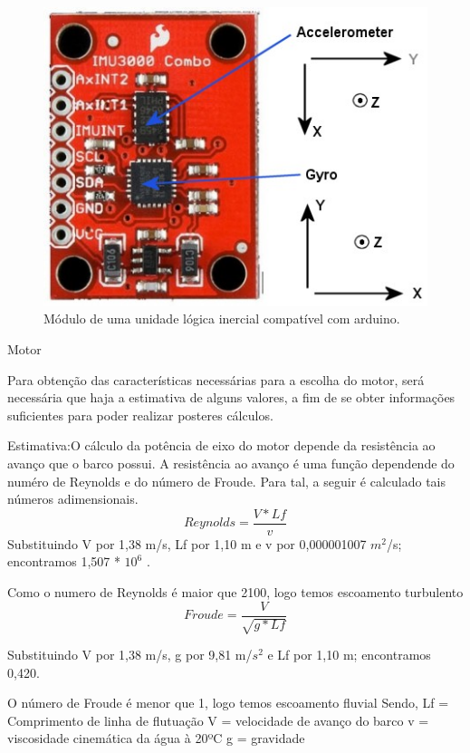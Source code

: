  \begin{figure} [!htp]
	\centering
	\includegraphics[scale=0.6]{figuras/IMU}
	\caption{Módulo de uma unidade lógica inercial compatível com arduino.}
	\label{IMU}
\end{figure}

Motor 


Para obtenção das características necessárias para a escolha do motor, será necessária que haja a estimativa de alguns valores, a fim de se obter informações suficientes para poder realizar posteres cálculos.



Estimativa:O cálculo da potência de eixo do motor depende da resistência ao avanço que o barco possui. A resistência ao avanço é uma função dependende do numéro de Reynolds e do número de Froude. Para tal, a seguir é calculado tais números adimensionais.
\begin{equation}\label{Reynolds}
Reynolds = \frac{V * Lf}{v} 
\end{equation}
Substituindo V por 1,38 m/s, Lf por 1,10 m e v por 0,000001007 $m^2$/s; encontramos 1,507 * $10^6$ .

 
Como o numero de Reynolds é maior que 2100, logo temos escoamento turbulento
\begin{equation}\label{Froude}
	Froude = \frac{V}{\sqrt{g * Lf} }
\end{equation}

Substituindo V por 1,38 m/s, g por 9,81 m/$s^2$ e Lf por  1,10 m; encontramos 0,420.

O número de Froude é menor que 1, logo temos escoamento fluvial
Sendo, 
Lf = Comprimento de linha de flutuação
V = velocidade de avanço do barco
v = viscosidade cinemática da água à 20ºC
g = gravidade
 
